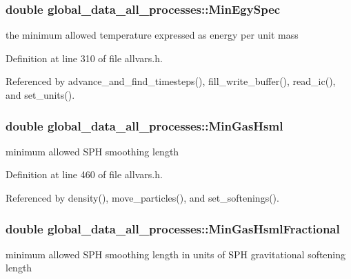 \hypertarget{structglobal__data__all__processes_ae298f2b76a8f1d0b932bee24c28987cf}{
\subsubsection[{MinEgySpec}]{\setlength{\rightskip}{0pt plus 5cm}double {\bf global\_\-data\_\-all\_\-processes::MinEgySpec}}}
\label{structglobal__data__all__processes_ae298f2b76a8f1d0b932bee24c28987cf}
the minimum allowed temperature expressed as energy per unit mass 

Definition at line 310 of file allvars.h.



Referenced by advance\_\-and\_\-find\_\-timesteps(), fill\_\-write\_\-buffer(), read\_\-ic(), and set\_\-units().

\hypertarget{structglobal__data__all__processes_aec92c94dd2a1d0f0e1ad56f2e790384a}{
\subsubsection[{MinGasHsml}]{\setlength{\rightskip}{0pt plus 5cm}double {\bf global\_\-data\_\-all\_\-processes::MinGasHsml}}}
\label{structglobal__data__all__processes_aec92c94dd2a1d0f0e1ad56f2e790384a}
minimum allowed SPH smoothing length 

Definition at line 460 of file allvars.h.



Referenced by density(), move\_\-particles(), and set\_\-softenings().

\hypertarget{structglobal__data__all__processes_acddf5d973c6847405b85f4531d5b7510}{
\subsubsection[{MinGasHsmlFractional}]{\setlength{\rightskip}{0pt plus 5cm}double {\bf global\_\-data\_\-all\_\-processes::MinGasHsmlFractional}}}
\label{structglobal__data__all__processes_acddf5d973c6847405b85f4531d5b7510}
minimum allowed SPH smoothing length in units of SPH gravitational softening length 


